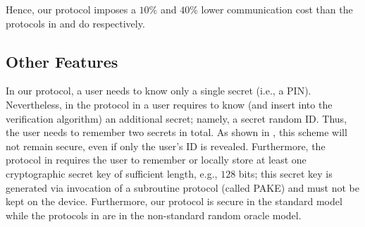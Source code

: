 Hence, our protocol imposes a $10\%$ and $40\%$ lower communication cost than the protocols in \cite{WangW18} and \cite{JareckiJKSS21} do respectively.


\subsection{Other Features}

 In our protocol, a user needs to know only a single secret (i.e., a  PIN). Nevertheless, in the protocol in \cite{WangW18} a user requires to know (and insert into the verification algorithm) an additional secret; namely, a secret random ID. Thus, the user needs to remember two secrets in total.  As shown in \cite{Scott12a}, this scheme will not remain secure, even if only the user's ID is revealed. Furthermore, the protocol in \cite{JareckiJKSS21} requires the user to remember or locally store at least one cryptographic secret key of sufficient length, e.g., $128$ bits; this secret key is generated via invocation of a subroutine protocol (called PAKE) and must not be kept on the device. 
 Furthermore, our protocol is secure in the standard model while the protocols in \cite{WangW18,JareckiJKSS21} are in the non-standard random oracle model. 

